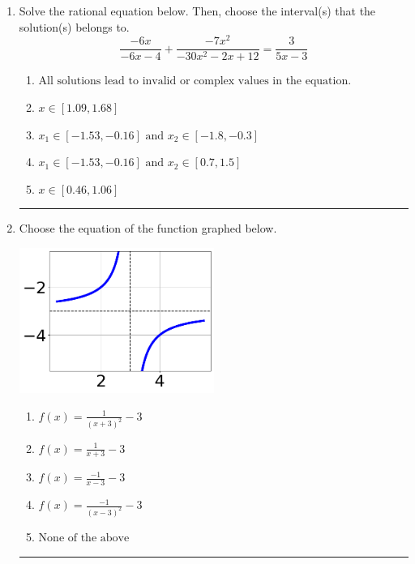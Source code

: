 \documentclass[14pt]{extbook}
\newcommand{\litem}[1]{\item#1\hspace*{-1cm}\rule{\textwidth}{0.4pt}}
\begin{document}
\begin{enumerate}
{\begin{enumerate}[label=\Alph*.]
\end{enumerate} }
\litem{
Solve the rational equation below. Then, choose the interval(s) that the solution(s) belongs to.\[ \frac{-6x}{-6x -4} + \frac{-7x^{2}}{-30x^{2} -2 x + 12} = \frac{3}{5x -3} \]\begin{enumerate}[label=\Alph*.]
\item \( \text{All solutions lead to invalid or complex values in the equation.} \)
\item \( x \in [1.09,1.68] \)
\item \( x_1 \in [-1.53, -0.16] \text{ and } x_2 \in [-1.8,-0.3] \)
\item \( x_1 \in [-1.53, -0.16] \text{ and } x_2 \in [0.7,1.5] \)
\item \( x \in [0.46,1.06] \)

\end{enumerate} }
\litem{
Choose the equation of the function graphed below.
\begin{center}
    \includegraphics[width=0.5\textwidth]{../Figures/rationalGraphToEquationB.png}
\end{center}
\begin{enumerate}[label=\Alph*.]
\item \( f(x) = \frac{1}{(x + 3)^2} - 3 \)
\item \( f(x) = \frac{1}{x + 3} - 3 \)
\item \( f(x) = \frac{-1}{x - 3} - 3 \)
\item \( f(x) = \frac{-1}{(x - 3)^2} - 3 \)
\item \( \text{None of the above} \)


\end{enumerate}}
\end{enumerate}
\end{document}
